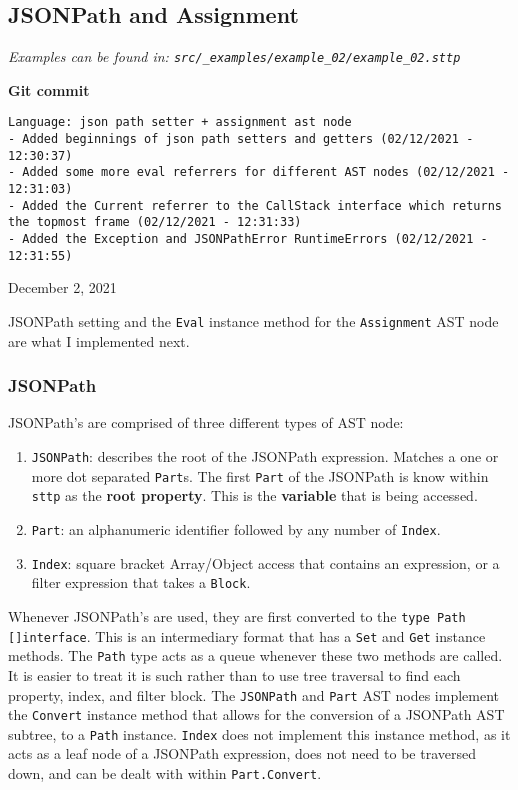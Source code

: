 \subsection{JSONPath and Assignment}

\cprotect\textit{Examples can be found in: \verb|src/_examples/example_02/example_02.sttp|}

\begin{center}
    \textbf{Git commit}
    \begin{verbatim}
Language: json path setter + assignment ast node
- Added beginnings of json path setters and getters (02/12/2021 - 12:30:37)
- Added some more eval referrers for different AST nodes (02/12/2021 - 12:31:03)
- Added the Current referrer to the CallStack interface which returns the topmost frame (02/12/2021 - 12:31:33)
- Added the Exception and JSONPathError RuntimeErrors (02/12/2021 - 12:31:55)
    \end{verbatim}
    \vspace{-1em}
    \tiny{December 2, 2021}
\end{center}

JSONPath setting and the \verb|Eval| instance method for the \verb|Assignment| AST node are what I implemented next.

\subsubsection{JSONPath}

JSONPath's are comprised of three different types of AST node:

\begin{enumerate}
    \item \verb|JSONPath|: describes the root of the JSONPath expression. Matches a one or more dot separated \verb|Part|s. The first \verb|Part| of the JSONPath is know within \verb|sttp| as the \textbf{root property}. This is the \textbf{variable} that is being accessed.
    \item \verb|Part|: an alphanumeric identifier followed by any number of \verb|Index|.
    \item \verb|Index|: square bracket Array/Object access that contains an expression, or a filter expression that takes a \verb|Block|.
\end{enumerate}

Whenever JSONPath's are used, they are first converted to the \texttt{type Path []interface{}}. This is an intermediary format that has a \verb|Set| and \verb|Get| instance methods. The \verb|Path| type acts as a queue whenever these two methods are called. It is easier to treat it is such rather than to use tree traversal to find each property, index, and filter block. The \verb|JSONPath| and \verb|Part| AST nodes implement the \verb|Convert| instance method that allows for the conversion of a JSONPath AST subtree, to a \verb|Path| instance. \verb|Index| does not implement this instance method, as it acts as a leaf node of a JSONPath expression, does not need to be traversed down, and can be dealt with within \verb|Part.Convert|.

